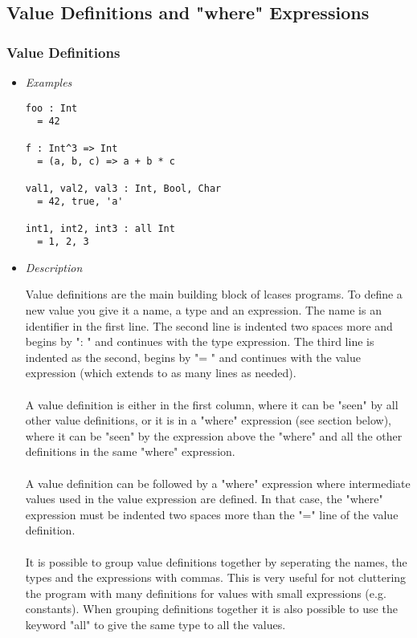\documentclass{article}
\begin{document}
\subsection{Value Definitions and "where" Expressions}
\label{subsec:valdefswhere}

\subsubsection{Value Definitions}
\label{subsubsec:valdefs}

\begin{itemize}

\item \textit{Examples}

\begin{verbatim}
foo : Int
  = 42

f : Int^3 => Int
  = (a, b, c) => a + b * c

val1, val2, val3 : Int, Bool, Char
  = 42, true, 'a'

int1, int2, int3 : all Int
  = 1, 2, 3
\end{verbatim}

\item \textit{Description}

Value definitions are the main building block of lcases programs. To define a
new value you give it a name, a type and an expression. The name is an
identifier in the first line. The second line is indented two spaces more and
begins by ": " and continues with the type expression. The third line is
indented as the second, begins by "= " and continues with the value
expression (which extends to as many lines as needed).
\\\\
A value definition is either in the first column, where it can be "seen" by all
other value definitions, or it is in a "where" expression (see section below),
where it can be "seen" by the expression above the "where" and all the other
definitions in the same "where" expression.
\\\\
A value definition can be followed by a "where" expression where intermediate
values used in the value expression are defined. In that case, the "where"
expression must be indented two spaces more than the "=" line of the value
definition.
\\\\
It is possible to group value definitions together by seperating the names, the
types and the expressions with commas. This is very useful for not cluttering
the program with many definitions for values with small expressions (e.g.
constants).  When grouping definitions together it is also possible to use the
keyword "all" to give the same type to all the values.


\end{itemize}
\end{document}
